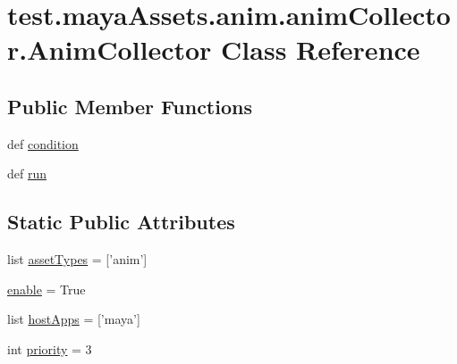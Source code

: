 \hypertarget{classtest_1_1mayaAssets_1_1anim_1_1animCollector_1_1AnimCollector}{\section{test.\-maya\-Assets.\-anim.\-anim\-Collector.\-Anim\-Collector \-Class \-Reference}
\label{d6/df4/classtest_1_1mayaAssets_1_1anim_1_1animCollector_1_1AnimCollector}
}
\subsection*{\-Public \-Member \-Functions}
\begin{DoxyCompactItemize}
\item 
def \hyperlink{classtest_1_1mayaAssets_1_1anim_1_1animCollector_1_1AnimCollector_a7c5c374a5a4c416131ab79e2ea5a93c5}{condition}
\item 
def \hyperlink{classtest_1_1mayaAssets_1_1anim_1_1animCollector_1_1AnimCollector_af8b489dc828a9aa22a17d16f0e4d033f}{run}
\end{DoxyCompactItemize}
\subsection*{\-Static \-Public \-Attributes}
\begin{DoxyCompactItemize}
\item 
list \hyperlink{classtest_1_1mayaAssets_1_1anim_1_1animCollector_1_1AnimCollector_a3ffafcc5c4bb6f1b4b74bd61ce75d7ea}{asset\-Types} = \mbox{[}'anim'\mbox{]}
\item 
\hyperlink{classtest_1_1mayaAssets_1_1anim_1_1animCollector_1_1AnimCollector_ae417ecce7c4fa39dcd9b455a2698c5e1}{enable} = \-True
\item 
list \hyperlink{classtest_1_1mayaAssets_1_1anim_1_1animCollector_1_1AnimCollector_a57c364b63e90108f7c5e76ca5dfac41f}{host\-Apps} = \mbox{[}'maya'\mbox{]}
\item 
int \hyperlink{classtest_1_1mayaAssets_1_1anim_1_1animCollector_1_1AnimCollector_a36e60cc06f56058a7b72bc3c1b81c90e}{priority} = 3
\end{DoxyCompactItemize}


